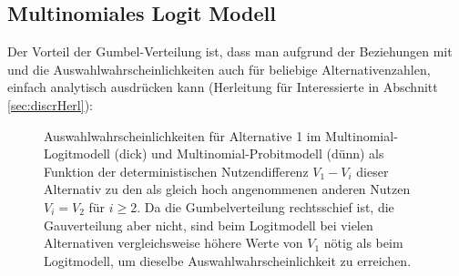 \subsection{\label{sec:MNL}Multinomiales Logit Modell}

Der Vorteil der Gumbel-Verteilung ist, dass man aufgrund der
Beziehungen  mit  und 
die Auswahlwahrscheinlichkeiten auch f\"ur beliebige Alternativenzahlen,
einfach analytisch ausdr\"ucken kann (Herleitung f\"ur Interessierte
in Abschnitt \ref{sec:discrHerl}):

\begin{figure}[t!]
  \caption{\label{fig:multiLogit}Auswahlwahrscheinlichkeiten f\"ur
Alternative 1 im Multinomial-Logitmodell (dick) und 
Multinomial-Probitmodell  (d\"unn) als Funktion der deterministischen 
Nutzendifferenz $V_1-V_i$ 
dieser Alternativ zu den als gleich hoch angenommenen anderen Nutzen 
$V_i=V_2$ f\"ur $i\ge 2$. Da die Gumbelverteilung
rechtsschief ist, die Gau\3verteilung aber nicht, sind beim
Logitmodell bei vielen Alternativen
vergleichsweise h\"ohere Werte von $V_1$ n\"otig als beim Logitmodell, um dieselbe
Auswahlwahrscheinlichkeit zu erreichen.
}
\end{figure}

